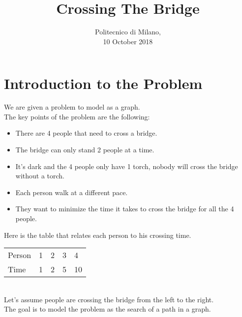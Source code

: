 \documentclass[1pt]{article}
\title{\huge \textrm{Crossing The Bridge}}
\date{\textrm{Politecnico di Milano, \\10 October 2018}}
\begin{document}
	\begin{titlepage}
		\maketitle
	\end{titlepage}


	\newpage
	\section{Introduction to the Problem}
		We are given a problem to model as a graph. \\
		The key points of the problem are the following: 
		\begin{itemize}
			\item There are 4 people that need to cross a bridge.
			\item The bridge can only stand 2 people at a time.
			\item It's dark and the 4 people only have 1 torch, nobody will cross the bridge without a torch.
			\item Each person walk at a different pace.
			\item They want to minimize the time it takes to cross the bridge for all the 4 people.
		\end{itemize}

		Here is the table that relates each person to his crossing time.
		\begin{table}[h]
			\centering
			\begin{tabular}{lllll}
				Person & 1 & 2 & 3 & 4  \\
				Time   & 1 & 2 & 5 & 10
			\end{tabular}
		\end{table}\\
		Let's assume people are crossing the bridge from the left to the right. \\
		The goal is to model the problem as the search of a path in a graph.
\end{document}
